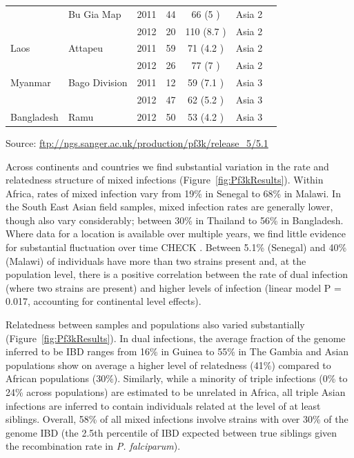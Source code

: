 \documentclass[9pt,lineno]{elife}
\begin{document}
\begin{table}[bt]
\begin{tabular}{l l c c c c c}
                &Bu Gia Map     &2011 &44   &66   (5   )&Asia 2  \\
                &               &2012 &20   &110  (8.7 )&Asia 2  \\
 \hline
Laos            &Attapeu        &2011 &59   &71   (4.2 )&Asia 2  \\
                &               &2012 &26   &77   (7   )&Asia 2  \\
 \hline
Myanmar         &Bago Division  &2011 &12   &59   (7.1 )&Asia 3  \\
                &               &2012 &47   &62   (5.2 )&Asia 3  \\
 \hline
Bangladesh      &Ramu           &2012 &50   &53   (4.2 )&Asia 3  \\
\bottomrule
\end{tabular}

\medskip
Source: \url{ftp://ngs.sanger.ac.uk/production/pf3k/release_5/5.1}

\end{table}

Across continents and countries we find substantial variation in the rate and relatedness structure of mixed infections (Figure~\ref{fig:Pf3kResults}).  Within Africa, rates of mixed infection vary from 19\% in Senegal to 68\% in Malawi.  In the South East Asian field samples, mixed infection rates are generally lower, though also vary considerably; between 30\% in Thailand to 56\% in Bangladesh.  Where data for a location is available over multiple years, we find little evidence for substantial fluctuation over time CHECK .  Between 5.1\% (Senegal) and 40\% (Malawi) of individuals have more than two strains present and, at the population level, there is a positive correlation between the rate of dual infection (where two strains are present) and higher levels of infection (linear model P = 0.017, accounting for continental level effects).

Relatedness between samples and populations also varied substantially (Figure~\ref{fig:Pf3kResults}).  In dual infections, the average fraction of the genome inferred to be IBD ranges from 16\% in Guinea to 55\% in The Gambia and Asian populations show on average a higher level of relatedness (41\%) compared to African populations (30\%).  Similarly, while a minority of triple infections (0\% to 24\% across populations) are estimated to be unrelated in Africa, all triple Asian infections are inferred to contain individuals related at the level of at least siblings.  Overall, 58\% of all mixed infections involve strains with over 30\% of the genome IBD (the 2.5th percentile of IBD expected between true siblings given the recombination rate in {\it P. falciparum}).
\end{document}

